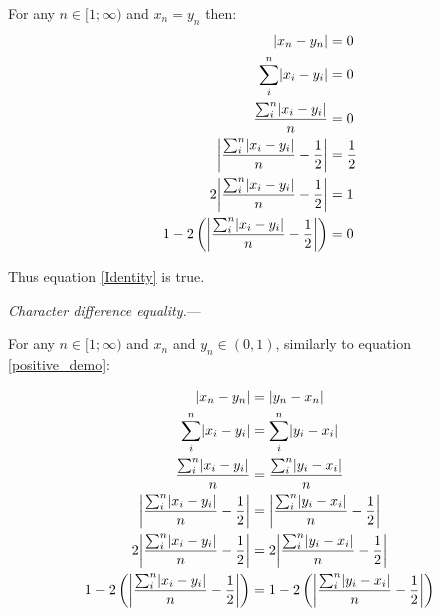 \documentclass[12pt,letterpaper]{article}
\DeclarePairedDelimiter\abs{\lvert}{\rvert}%
\renewcommand{\subsection}[1]{%
\bigskip
\begin{center}
\begin{large}
\normalfont\itshape #1
\end{large}
\end{center}}
\renewcommand{\subsection}[1]{%
\vspace{2ex}
\noindent
\textit{#1.}---}
\begin{document}
For any $n \in [1;\infty)$ and $x_{n} = y_{n}$ then:
\begin{equation}
    \label{identitydemo}
    \begin{aligned}
    \abs{x_{n}-y_{n}} &= 0\\
    \sum_{i}^{n}\abs{x_{i}-y_{i}} &= 0\\
    \frac{\sum_{i}^{n}\abs{x_{i}-y_{i}}}{n} &= 0\\
    \abs*{\frac{\sum_{i}^{n}\abs{x_{i}-y_{i}}}{n}-\frac{1}{2}} &= \frac{1}{2}\\
    2\abs*{\frac{\sum_{i}^{n}\abs{x_{i}-y_{i}}}{n}-\frac{1}{2}} &= 1\\
    1 - 2\left(\abs*{\frac{\sum_{i}^{n}\abs{x_{i}-y_{i}}}{n}-\frac{1}{2}}\right) &= 0\\
    \end{aligned}
\end{equation}

Thus equation \ref{Identity} is true.

\subsection{Character difference equality}

For any $n \in [1;\infty)$ and $x_{n}$ and $y_{n} \in (0,1)$, similarly to equation \ref{positive_demo}:

\begin{equation}
    \label{equality_demo}
    \begin{aligned}
    \abs{x_{n}-y_{n}} &= \abs{y_{n}-x_{n}}\\
    \sum_{i}^{n}\abs{x_{i}-y_{i}} &= \sum_{i}^{n}\abs{y_{i}-x_{i}}\\
    \frac{\sum_{i}^{n}\abs{x_{i}-y_{i}}}{n} &= \frac{\sum_{i}^{n}\abs{y_{i}-x_{i}}}{n}\\
    \abs*{\frac{\sum_{i}^{n}\abs{x_{i}-y_{i}}}{n}-\frac{1}{2}} &= \abs*{\frac{\sum_{i}^{n}\abs{y_{i}-x_{i}}}{n}-\frac{1}{2}}\\
    2\abs*{\frac{\sum_{i}^{n}\abs{x_{i}-y_{i}}}{n}-\frac{1}{2}} &= 2\abs*{\frac{\sum_{i}^{n}\abs{y_{i}-x_{i}}}{n}-\frac{1}{2}}\\
    1 - 2\left(\abs*{\frac{\sum_{i}^{n}\abs{x_{i}-y_{i}}}{n}-\frac{1}{2}}\right) &= 1 - 2\left(\abs*{\frac{\sum_{i}^{n}\abs{y_{i}-x_{i}}}{n}-\frac{1}{2}}\right)\\
    \end{aligned}
\end{equation}
\end{document}
